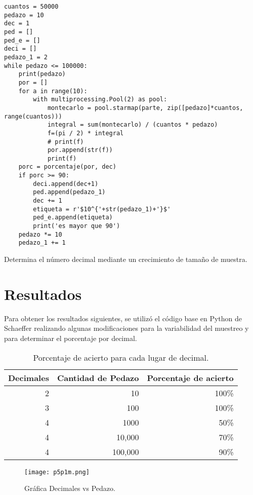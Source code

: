 \documentclass{article}
\begin{document}
\renewcommand{\listingscaption}{Código}
\begin{listing}[H]
  \begin{verbatim}
cuantos = 50000
pedazo = 10
dec = 1
ped = []
ped_e = []
deci = []
pedazo_1 = 2
while pedazo <= 100000:
    print(pedazo)
    por = []
    for a in range(10):
        with multiprocessing.Pool(2) as pool:
            montecarlo = pool.starmap(parte, zip([pedazo]*cuantos, range(cuantos)))
            integral = sum(montecarlo) / (cuantos * pedazo)
            f=(pi / 2) * integral
            # print(f)
            por.append(str(f))
            print(f)
    porc = porcentaje(por, dec)
    if porc >= 90:
        deci.append(dec+1)
        ped.append(pedazo_1)
        dec += 1
        etiqueta = r'$10^{'+str(pedazo_1)+'}$'
        ped_e.append(etiqueta)
        print('es mayor que 90')
    pedazo *= 10
    pedazo_1 += 1
    \end{verbatim}
  \label{lst:fibo}
  \caption{Determina el número decimal mediante un crecimiento de tamaño de muestra.}
\end{listing}

\section{Resultados}
Para obtener los resultados siguientes, se utilizó el código base en Python de Schaeffer \cite{Elisa_Schaeffer} realizando algunas modificaciones para la variabilidad del muestreo y para determinar el porcentaje por decimal.

\begin{table}[h!]
\centering
\caption{Porcentaje de acierto para cada lugar de decimal.}
 \begin{tabular}{||r r r||} 
 \hline
 Decimales & Cantidad de Pedazo & Porcentaje de acierto  \\ [0.5ex] 
 \hline\hline
 2 & 10 & 100\% \\
 \hline
 3 & 100 & 100\%\\ 
 \hline
 4 & 1000 & 50\%  \\
 \hline
 4 & 10,000 & 70\% \\
 \hline
 4 & 100,000 & 90\% \\
 \hline
\end{tabular}
\label{table:1}
\end{table}


\begin{figure}[H]
\centering
\texttt{[image: p5p1m.png]}
\caption{\label{fig3} Gráfica Decimales vs Pedazo.}
\end{figure}
\end{document}
